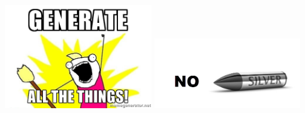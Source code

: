 \documentclass{beamer}
\begin{document}
\begin{frame}
\includegraphics[width=0.48\textwidth]{generate_all_the_things.jpg}
\includegraphics[width=0.48\textwidth]{no_silver_bullet.jpg}
\end{frame}
\end{document}
